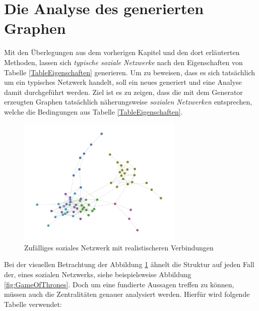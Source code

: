 \section{Die Analyse des generierten Graphen}
Mit den Überlegungen aus dem vorherigen Kapitel und den dort erläuterten Methoden, lassen sich \textit{typische soziale Netzwerke} nach den Eigenschaften von Tabelle \ref{TableEigenschaften} generieren. Um zu beweisen, dass es sich tatsächlich um ein typisches Netzwerk handelt, soll ein neues generiert und eine Analyse damit durchgeführt werden. Ziel ist es zu zeigen, dass die mit dem Generator erzeugten Graphen tatsächlich näherungsweise \textit{sozialen Netzwerken} entsprechen, welche die Bedingungen aus Tabelle \ref{TableEigenschaften}.

\FloatBarrier
\begin{figure}[h!]
    \centering
    \hspace*{-2cm}
    \includegraphics[width=0.7\textwidth]{Graphics/Random_moreConnections.jpg}
    \caption{Zufälliges soziales Netzwerk mit realistischeren Verbindungen}
    \label{fig:SNA}
\end{figure}

\FloatBarrier

Bei der visuellen Betrachtung der Abbildung \ref{fig:SNA} ähnelt die Struktur auf jeden Fall der, eines sozialen Netzwerks, siehe beispielsweise Abbildung \ref{fig:GameOfThrones}. Doch um eine fundierte Aussagen treffen zu können, müssen auch die Zentralitäten genauer analysiert werden. Hierfür wird folgende Tabelle verwendet:

